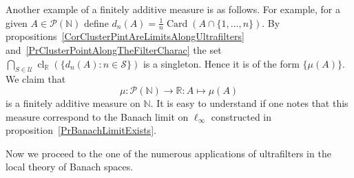 \documentclass[12pt]{article}
\begin{document}
Another example of a finitely additive measure is as follows. For example, for a
given $A\in\mathcal{P}(\mathbb{N})$ define
$d_n(A)=\frac{1}{n}\operatorname{Card}(A\cap \{1,\ldots,n\})$. By
propositions~\ref{CorClusterPintAreLimitsAlongUltrafilters}
and~\ref{PrClusterPointAlongTheFilterCharac} the set $\bigcap_{S\in\mathcal{U}}
    \operatorname{cl}_{\mathbb{R}}(\{d_n(A):n\in\mathcal{S}\})$ is a singleton.
Hence it is of the form $\{\mu(A)\}$. We claim that
$$
    \mu:\mathcal{P}(\mathbb{N})\to\mathbb{R}:A\mapsto\mu(A)
$$
is a finitely additive measure on $\mathbb{N}$. It is easy to understand if one
notes that this measure correspond to the Banach limit on ${\ell}_\infty$
constructed in proposition~\ref{PrBanachLimitExists}.

Now we proceed to the one of the numerous applications of ultrafilters in the
local theory of Banach spaces.
\end{document}

